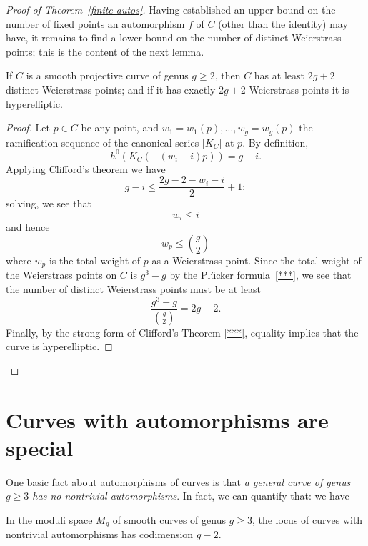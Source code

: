 \begin{proof}[Proof of Theorem~\ref{finite autos}]
Having established an upper  bound on the number of fixed points an automorphism $f$ of $C$ (other than the identity) may have, it remains to find a lower bound on the number of distinct Weierstrass points; this is the content of the next lemma.


\begin{lemma}
If $C$ is a smooth projective curve of genus $g \geq 2$, then $C$ has at least $2g+2$ distinct Weierstrass points; and if it has exactly $2g+2$ Weierstrass points it is hyperelliptic.
\end{lemma}

\begin{proof}
Let $p \in C$ be any point, and $w_1=w_1(p),\dots,w_g = w_g(p)$ the ramification sequence of the canonical series $|K_C|$ at $p$. By definition, 
$$
h^0(K_C(-(w_i+i)p)) = g - i.
$$
Applying Clifford's theorem we have
$$
g-i \leq \frac{2g - 2 - w_i - i}{2} + 1;
$$
solving, we see that
$$
w_i \leq i
$$
and hence
$$
w_p \leq \binom{g}{2}
$$
where $w_p$ is the total weight of $p$ as a Weierstrass point. Since the total weight of the Weierstrass points on $C$ is $g^3-g$ by the Pl\"ucker formula~\ref{***}, we see that the number of distinct Weierstrass points must be at least
$$
\frac{g^3-g}{\binom{g}{2}} = 2g+2.
$$
Finally, by the strong form of Clifford's Theorem \ref{***}, equality implies that the curve is hyperelliptic.\end{proof}


\end{proof}

\section{Curves with automorphisms are special}\label{curves with automorphisms}

One basic fact about automorphisms of curves is that \emph{a general curve of genus $g \geq 3$ has no nontrivial automorphisms}. In fact, we can quantify that: we have

\begin{lemma}
In the moduli space $M_g$ of smooth curves of genus $g \geq 3$, the locus of curves with nontrivial automorphisms has codimension $g-2$.
\end{lemma}

